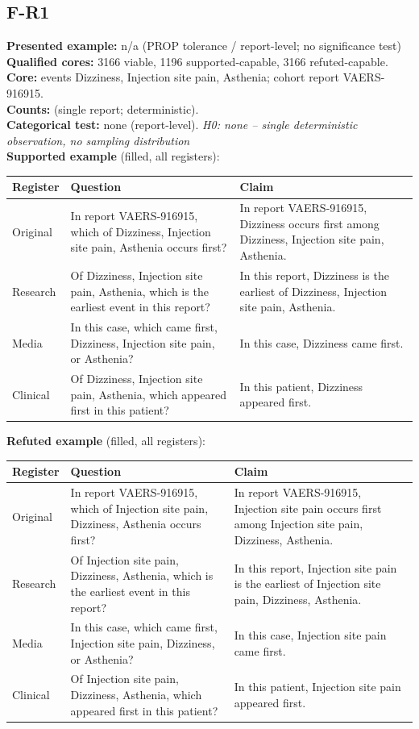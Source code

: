 \documentclass[11pt]{article}
\begin{document}
\subsection*{F-R1}
\textbf{Presented example:} n/a (PROP tolerance / report-level; no significance test) \\
\textbf{Qualified cores:} 3166 viable, 1196 supported-capable, 3166 refuted-capable. \\
\textbf{Core:} events Dizziness, Injection site pain, Asthenia; cohort report VAERS-916915. \\
\textbf{Counts:} (single report; deterministic). \\
\textbf{Categorical test:} none (report-level). \emph{H0: none -- single deterministic observation, no sampling distribution} \\
\textbf{Supported example} (filled, all registers): \\
\begin{tabularx}{\linewidth}{@{}l L L@{}}
\toprule
\textbf{Register} & \textbf{Question} & \textbf{Claim} \\
\midrule
Original & In report VAERS-916915, which of Dizziness, Injection site pain, Asthenia occurs first? & In report VAERS-916915, Dizziness occurs first among Dizziness, Injection site pain, Asthenia. \\
Research & Of Dizziness, Injection site pain, Asthenia, which is the earliest event in this report? & In this report, Dizziness is the earliest of Dizziness, Injection site pain, Asthenia. \\
Media & In this case, which came first, Dizziness, Injection site pain, or Asthenia? & In this case, Dizziness came first. \\
Clinical & Of Dizziness, Injection site pain, Asthenia, which appeared first in this patient? & In this patient, Dizziness appeared first. \\
\bottomrule
\end{tabularx}
\vspace{3pt}
\textbf{Refuted example} (filled, all registers): \\
\begin{tabularx}{\linewidth}{@{}l L L@{}}
\toprule
\textbf{Register} & \textbf{Question} & \textbf{Claim} \\
\midrule
Original & In report VAERS-916915, which of Injection site pain, Dizziness, Asthenia occurs first? & In report VAERS-916915, Injection site pain occurs first among Injection site pain, Dizziness, Asthenia. \\
Research & Of Injection site pain, Dizziness, Asthenia, which is the earliest event in this report? & In this report, Injection site pain is the earliest of Injection site pain, Dizziness, Asthenia. \\
Media & In this case, which came first, Injection site pain, Dizziness, or Asthenia? & In this case, Injection site pain came first. \\
Clinical & Of Injection site pain, Dizziness, Asthenia, which appeared first in this patient? & In this patient, Injection site pain appeared first. \\
\bottomrule
\end{tabularx}
\vspace{3pt}
\end{document}
